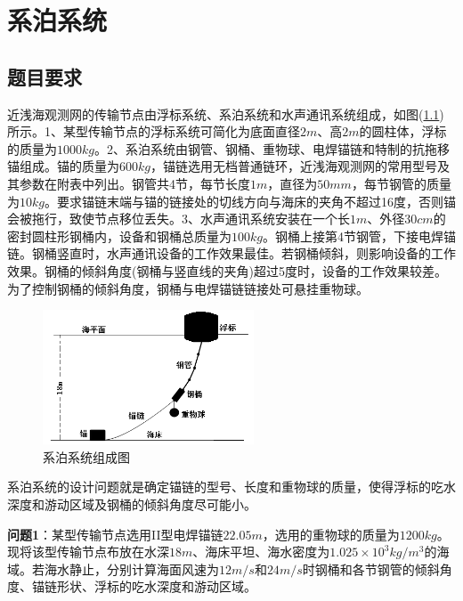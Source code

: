 \documentclass[UTF8]{ctexbook}
\theoremstyle{nonumberplain}
\begin{document}
\chapter{系泊系统}
\section{题目要求}
    \par
    近浅海观测网的传输节点由浮标系统、系泊系统和水声通讯系统组成，如图(\ref{fig:系泊系统组成图})所示。1、某型传输节点的浮标系统可简化为底面直径$2m$、高$2m$的圆柱体，浮标的质量为$1000kg$。2、系泊系统由钢管、钢桶、重物球、电焊锚链和特制的抗拖移锚组成。锚的质量为$600kg$，锚链选用无档普通链环，近浅海观测网的常用型号及其参数在附表中列出。钢管共4节，每节长度$1m$，直径为$50mm$，每节钢管的质量为$10kg$。要求锚链末端与锚的链接处的切线方向与海床的夹角不超过16度，否则锚会被拖行，致使节点移位丢失。3、水声通讯系统安装在一个长$1m$、外径$30cm$的密封圆柱形钢桶内，设备和钢桶总质量为$100kg$。钢桶上接第4节钢管，下接电焊锚链。钢桶竖直时，水声通讯设备的工作效果最佳。若钢桶倾斜，则影响设备的工作效果。钢桶的倾斜角度(钢桶与竖直线的夹角)超过5度时，设备的工作效果较差。为了控制钢桶的倾斜角度，钢桶与电焊锚链链接处可悬挂重物球。
            \begin{figure}[H]
            \centering
            \includegraphics[height=4cm]{images/xiposystem.jpg}
            \caption{系泊系统组成图}
            \label{fig:系泊系统组成图}
            \end{figure}
    \par
    系泊系统的设计问题就是确定锚链的型号、长度和重物球的质量，使得浮标的吃水深度和游动区域及钢桶的倾斜角度尽可能小。
    \par
    \textbf{问题1}：某型传输节点选用II型电焊锚链$22.05m$，选用的重物球的质量为$1200kg$。现将该型传输节点布放在水深$18m$、海床平坦、海水密度为$1.025\times 10^3kg/m^3$的海域。若海水静止，分别计算海面风速为$12m/s$和$24m/s$时钢桶和各节钢管的倾斜角度、锚链形状、浮标的吃水深度和游动区域。
\end{document}
